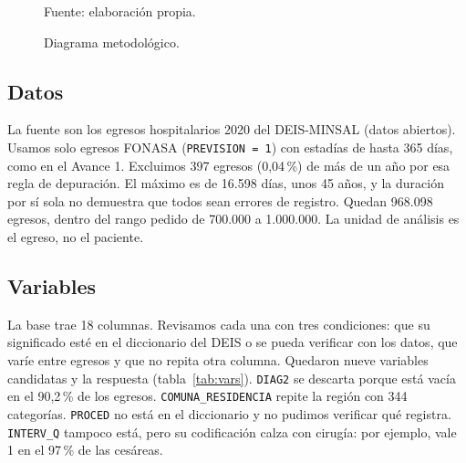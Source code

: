 \documentclass[10.5pt,a4paper,headings=small,abstract=false,bibliography=totoc,listof=totoc]{scrartcl}
\newcommand{\pct}{\,\%}
\begin{document}
\begin{figure}[!htb]
\centering
\caption{Diagrama metodológico.}
\label{fig:diagrama}
{\footnotesize\color{gris}Fuente: elaboración propia.\par}
\end{figure}

\subsection{Datos}

La fuente son los egresos hospitalarios 2020 del DEIS-MINSAL (datos abiertos). Usamos solo egresos FONASA (\texttt{PREVISION = 1}) con estadías de hasta 365 días, como en el Avance 1. Excluimos 397 egresos (0,04\pct{}) de más de un año por esa regla de depuración. El máximo es de 16.598 días, unos 45 años, y la duración por sí sola no demuestra que todos sean errores de registro. Quedan 968.098 egresos, dentro del rango pedido de 700.000 a 1.000.000. La unidad de análisis es el egreso, no el paciente.

\subsection{Variables}

La base trae 18 columnas. Revisamos cada una con tres condiciones: que su significado esté en el diccionario del DEIS o se pueda verificar con los datos, que varíe entre egresos y que no repita otra columna. Quedaron nueve variables candidatas y la respuesta (tabla~\ref{tab:vars}). \texttt{DIAG2} se descarta porque está vacía en el 90,2\pct{} de los egresos. \texttt{COMUNA\_RESIDENCIA} repite la región con 344 categorías. \texttt{PROCED} no está en el diccionario y no pudimos verificar qué registra. \texttt{INTERV\_Q} tampoco está, pero su codificación calza con cirugía: por ejemplo, vale 1 en el 97\pct{} de las cesáreas.
\end{document}
